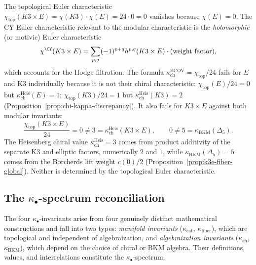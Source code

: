 \begin{proposition}[\texorpdfstring{$\chi/24 \neq \kappa_{\mathrm{ch}}$}{chi/24 != kappa-ch} in general]
\label{warn:k3e-chi-kappa}
The topological Euler characteristic $\chi_{\mathrm{top}}(K3 \times E) = \chi(K3) \cdot \chi(E) = 24 \cdot 0 = 0$ vanishes because $\chi(E) = 0$. The CY Euler characteristic relevant to the modular characteristic is the \emph{holomorphic} (or motivic) Euler characteristic
\[
 \chi^{\CY}(K3 \times E) = \sum_{p,q} (-1)^{p+q} h^{p,q}(K3 \times E) \cdot (\text{weight factor}),
\]
which accounts for the Hodge filtration. The formula $\kappa_{\mathrm{ch}}^{\mathrm{BCOV}} = \chi_{\mathrm{top}}/24$ fails for $E$ and K3 individually because it is not their chiral characteristic: $\chi_{\mathrm{top}}(E)/24 = 0$ but $\kappa_{\mathrm{ch}}^{\mathrm{Heis}}(E) = 1$; $\chi_{\mathrm{top}}(K3)/24 = 1$ but $\kappa_{\mathrm{ch}}^{\mathrm{Heis}}(K3) = 2$ (Proposition~\ref{prop:chi-kappa-discrepancy}). It also fails for $K3 \times E$ against both modular invariants:
\[
 \frac{\chi_{\mathrm{top}}(K3 \times E)}{24} = 0 \neq 3 = \kappa_{\mathrm{ch}}^{\mathrm{Heis}}(K3 \times E), \qquad
 0 \neq 5 = \kappa_{\mathrm{BKM}}(\Delta_5).
\]
The Heisenberg chiral value $\kappa_{\mathrm{ch}}^{\mathrm{Heis}} = 3$ comes from product additivity of the separate K3 and elliptic factors, numerically $2$ and $1$, while $\kappa_{\mathrm{BKM}}(\Delta_5) = 5$ comes from the Borcherds lift weight $c(0)/2$ (Proposition~\ref{prop:k3e-fiber-global}). Neither is determined by the topological Euler characteristic.
\end{proposition}


\subsection{The \texorpdfstring{$\kappa_\bullet$}{kappa-.}-spectrum reconciliation}
\label{subsec:kappa-spectrum-reconciliation}

The four $\kappa_\bullet$-invariants arise from four genuinely distinct mathematical constructions and fall into two types: \emph{manifold invariants} ($\kappa_{\mathrm{cat}}$, $\kappa_{\mathrm{fiber}}$), which are topological and independent of algebraization, and \emph{algebraization invariants} ($\kappa_{\mathrm{ch}}$, $\kappa_{\mathrm{BKM}}$), which depend on the choice of chiral or BKM algebra. Their definitions, values, and interrelations constitute the $\kappa_\bullet$-spectrum.

